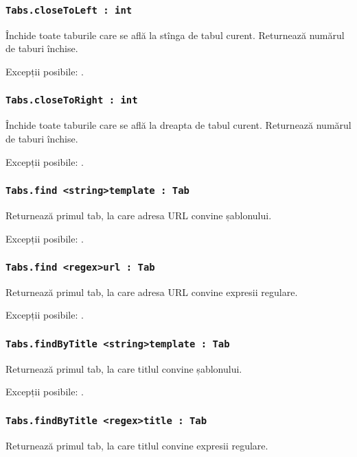 \subsubsection{\lstinline|Tabs.closeToLeft : int|}

Închide toate taburile care se află la stînga de tabul curent. Returnează numărul de taburi închise.

Excepții posibile: .

\subsubsection{\lstinline|Tabs.closeToRight : int|}

Închide toate taburile care se află la dreapta de tabul curent. Returnează numărul de taburi închise.

Excepții posibile: .

\subsubsection{\lstinline|Tabs.find <string>template : Tab|}

Returnează primul tab, la care adresa URL convine șablonului.

Excepții posibile: .

\subsubsection{\lstinline|Tabs.find <regex>url : Tab|}

Returnează primul tab, la care adresa URL convine expresii regulare.

Excepții posibile: .

\subsubsection{\lstinline|Tabs.findByTitle <string>template : Tab|}

Returnează primul tab, la care titlul convine șablonului.

Excepții posibile: .

\subsubsection{\lstinline|Tabs.findByTitle <regex>title : Tab|}

Returnează primul tab, la care titlul convine expresii regulare.

